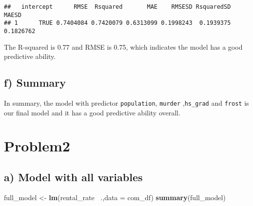 \documentclass[]{article}
\newenvironment{Shaded}{\begin{snugshade}}{\end{snugshade}}
\newcommand{\DataTypeTok}[1]{\textcolor[rgb]{0.13,0.29,0.53}{#1}}
\newcommand{\KeywordTok}[1]{\textcolor[rgb]{0.13,0.29,0.53}{\textbf{#1}}}
\newcommand{\NormalTok}[1]{#1}
\newcommand{\OperatorTok}[1]{\textcolor[rgb]{0.81,0.36,0.00}{\textbf{#1}}}
\newcommand{\StringTok}[1]{\textcolor[rgb]{0.31,0.60,0.02}{#1}}
\begin{document}
\begin{verbatim}
##   intercept      RMSE  Rsquared       MAE    RMSESD RsquaredSD     MAESD
## 1      TRUE 0.7404084 0.7420079 0.6313099 0.1998243  0.1939375 0.1826762
\end{verbatim}

The R-squared is 0.77 and RMSE is 0.75, which indicates the model has a
good predictive ability.

\hypertarget{f-summary}{%
\subsection{f) Summary}\label{f-summary}}

In summary, the model with predictor \texttt{population},
\texttt{murder} ,\texttt{hs\_grad} and \texttt{frost} is our final model
and it has a good predictive ability overall.

\hypertarget{problem2}{%
\section{Problem2}\label{problem2}}

\begin{Shaded}
\end{Shaded}

\hypertarget{a-model-with-all-variables}{%
\subsection{a) Model with all
variables}\label{a-model-with-all-variables}}

\begin{Shaded}
\begin{Highlighting}[]
\NormalTok{full_model <-}\StringTok{ }\KeywordTok{lm}\NormalTok{(rental_rate }\OperatorTok{~}\NormalTok{.,}\DataTypeTok{data =}\NormalTok{ com_df)}
\KeywordTok{summary}\NormalTok{(full_model)}
\end{Highlighting}
\end{Shaded}
\end{document}
